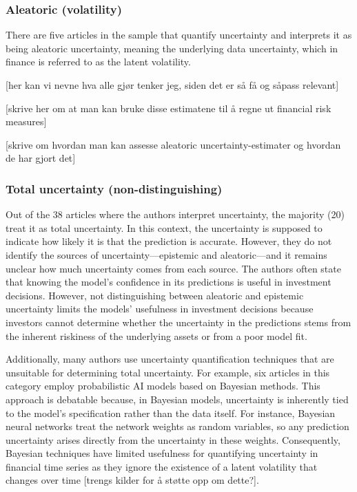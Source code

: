 \subsubsection{Aleatoric (volatility)}
There are five articles in the sample that quantify uncertainty and interprets it as being aleatoric uncertainty, meaning the underlying data uncertainty, which in finance is referred to as the latent volatility.

[her kan vi nevne hva alle gjør tenker jeg, siden det er så få og såpass relevant]

[skrive her om at man kan bruke disse estimatene til å regne ut financial risk measures]

[skrive om hvordan man kan assesse aleatoric uncertainty-estimater og hvordan de har gjort det]


\subsubsection{Total uncertainty (non-distinguishing)}
Out of the 38 articles where the authors interpret uncertainty, the majority (20) treat it as total uncertainty. In this context, the uncertainty is supposed to indicate how likely it is that the prediction is accurate. However, they do not identify the sources of uncertainty—epistemic and aleatoric—and it remains unclear how much uncertainty comes from each source. The authors often state that knowing the model's confidence in its predictions is useful in investment decisions. However, not distinguishing between aleatoric and epistemic uncertainty limits the models' usefulness in investment decisions because investors cannot determine whether the uncertainty in the predictions stems from the inherent riskiness of the underlying assets or from a poor model fit.

Additionally, many authors use uncertainty quantification techniques that are unsuitable for determining total uncertainty. For example, six articles in this category employ probabilistic AI models based on Bayesian methods. This approach is debatable because, in Bayesian models, uncertainty is inherently tied to the model's specification rather than the data itself. For instance, Bayesian neural networks treat the network weights as random variables, so any prediction uncertainty arises directly from the uncertainty in these weights. Consequently, Bayesian techniques have limited usefulness for quantifying uncertainty in financial time series as they ignore the existence of a latent volatility that changes over time [trengs kilder for å støtte opp om dette?].


